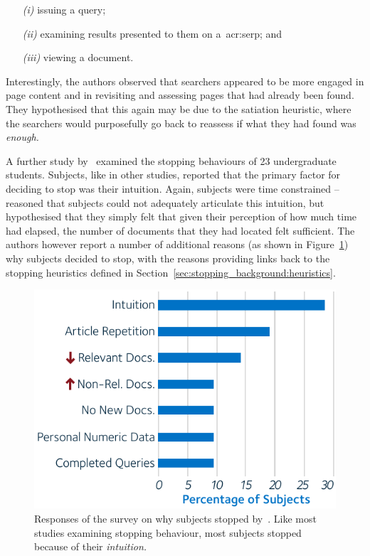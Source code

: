\begin{itemize}
    \item[\emph{(i)}]{issuing a query;}
    \item[\emph{(ii)}]{examining results presented to them on a~\gls{acr:serp}; and}
    \item[\emph{(iii)}]{viewing a document.}
\end{itemize}

Interestingly, the authors observed that searchers appeared to be more engaged in page content and in revisiting and assessing pages that had already been found. They hypothesised that this again may be due to the satiation heuristic, where the searchers would purposefully go back to reassess if what they had found was \emph{enough.}

A further study by~\cite{dostert2009satisficing} examined the stopping behaviours of 23 undergraduate students. Subjects, like in other studies, reported that the primary factor for deciding to stop was their intuition. Again, subjects were time constrained --~\cite{dostert2009satisficing} reasoned that subjects could not adequately articulate this intuition, but hypothesised that they simply felt that given their perception of how much time had elapsed, the number of documents that they had located felt sufficient. The authors however report a number of additional reasons (as shown in Figure~\ref{fig:stopping_respondents}) why subjects decided to stop, with the reasons providing links back to the stopping heuristics defined in Section~\ref{sec:stopping_background:heuristics}.

\begin{figure}
    \begin{center}
    \vspace*{-10mm}
    \includegraphics[width=1\textwidth]{figures/ch3-respondents.pdf}
    \end{center}
    \vspace*{-4mm}
    \caption[Responses of a survey by~\cite{dostert2009satisficing}]{Responses of the survey on why subjects stopped by~\cite{dostert2009satisficing}. Like most studies examining stopping behaviour, most subjects stopped because of their \emph{intuition.}}
    \label{fig:stopping_respondents}
\end{figure}

